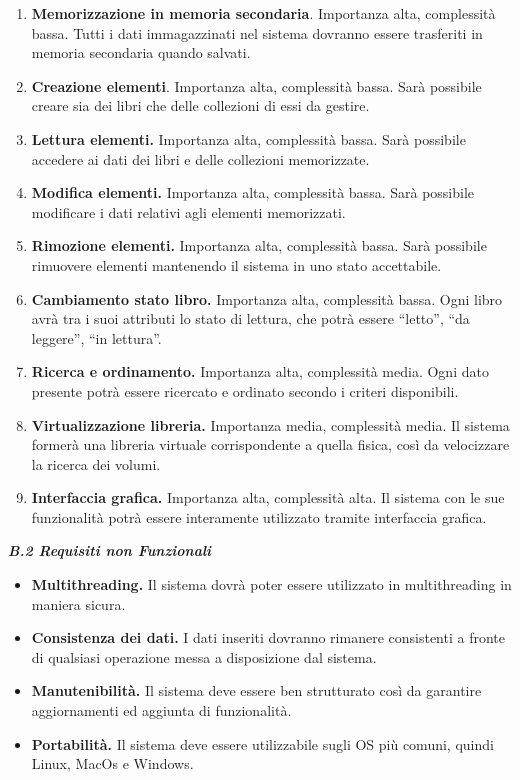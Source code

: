 \documentclass[a4paper,12pt]{report}
\begin{document}
\begin{enumerate}
  \def\labelenumi{\arabic{enumi}.}
  \item
    \textbf{Memorizzazione in memoria secondaria}. Importanza alta,
    complessità bassa. Tutti i dati immagazzinati nel sistema dovranno
    essere trasferiti in memoria secondaria quando salvati.
  \item
    \textbf{Creazione elementi}. Importanza alta, complessità bassa. Sarà
    possibile creare sia dei libri che delle collezioni di essi da
    gestire.
  \item
    \textbf{Lettura elementi.} Importanza alta, complessità bassa. Sarà
    possibile accedere ai dati dei libri e delle collezioni memorizzate.
  \item
    \textbf{Modifica elementi.} Importanza alta, complessità bassa. Sarà
    possibile modificare i dati relativi agli elementi memorizzati.
  \item
    \textbf{Rimozione elementi.} Importanza alta, complessità bassa. Sarà
    possibile rimuovere elementi mantenendo il sistema in uno stato
    accettabile.
  \item
    \textbf{Cambiamento stato libro.} Importanza alta, complessità bassa.
    Ogni libro avrà tra i suoi attributi lo stato di lettura, che potrà
    essere ``letto'', ``da leggere'', ``in lettura''.
  \item
    \textbf{Ricerca e ordinamento.} Importanza alta, complessità media.
    Ogni dato presente potrà essere ricercato e ordinato secondo i criteri
    disponibili.
  \item
    \textbf{Virtualizzazione libreria.} Importanza media, complessità
    media. Il sistema formerà una libreria virtuale corrispondente a
    quella fisica, così da velocizzare la ricerca dei volumi.
  \item
    \textbf{Interfaccia grafica.} Importanza alta, complessità alta. Il
    sistema con le sue funzionalità potrà essere interamente utilizzato
    tramite interfaccia grafica.
\end{enumerate}

\emph{\textbf{B.2 Requisiti non Funzionali}}

\begin{itemize}
  \item
    \textbf{Multithreading.} Il sistema dovrà poter essere utilizzato in
    multithreading in maniera sicura.
  \item
    \textbf{Consistenza dei dati.} I dati inseriti dovranno rimanere
    consistenti a fronte di qualsiasi operazione messa a disposizione dal
    sistema.
  \item
    \textbf{Manutenibilità.} Il sistema deve essere ben strutturato così
    da garantire aggiornamenti ed aggiunta di funzionalità.
  \item
    \textbf{Portabilità.} Il sistema deve essere utilizzabile sugli OS più
    comuni, quindi Linux, MacOs e Windows.
\end{itemize}
\end{document}
